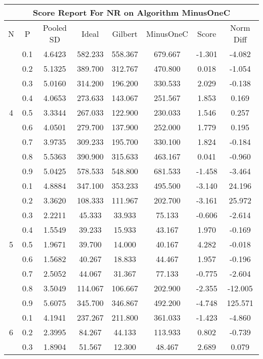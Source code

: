 \documentclass[11pt,a4paper]{report}
\begin{document}
\begin{longtable}{ | c | c || c | c | c | c | c | c | }
\hline
\multicolumn{8}{|c|}{ Score Report For NR on Algorithm MinusOneC} \\
\hline
N & P & Pooled SD &  Ideal &  Gilbert & MinusOneC  & Score & Norm Diff \\
 \hline
 \hline
 \endhead
\multirow{9}{*}{4} & 0.1 & 4.6423 & 582.233 & 558.367 & 679.667 & -1.301 & -4.082 \\
 & 0.2 & 5.1325 & 389.700 & 312.767 & 470.800 & 0.018 & -1.054 \\
 & 0.3 & 5.0160 & 314.200 & 196.200 & 330.533 & 2.029 & -0.138 \\
 & 0.4 & 4.0653 & 273.633 & 143.067 & 251.567 & 1.853 & 0.169 \\
 & 0.5 & 3.3344 & 267.033 & 122.900 & 230.033 & 1.546 & 0.257 \\
 & 0.6 & 4.0501 & 279.700 & 137.900 & 252.000 & 1.779 & 0.195 \\
 & 0.7 & 3.9735 & 309.233 & 195.700 & 330.100 & 1.824 & -0.184 \\
 & 0.8 & 5.5363 & 390.900 & 315.633 & 463.167 & 0.041 & -0.960 \\
 & 0.9 & 5.0425 & 578.533 & 548.800 & 681.533 & -1.458 & -3.464 \\
 \hline
\multirow{9}{*}{5} & 0.1 & 4.8884 & 347.100 & 353.233 & 495.500 & -3.140 & 24.196 \\
 & 0.2 & 3.3620 & 108.333 & 111.967 & 202.700 & -3.161 & 25.972 \\
 & 0.3 & 2.2211 & 45.333 & 33.933 & 75.133 & -0.606 & -2.614 \\
 & 0.4 & 1.5549 & 39.233 & 15.933 & 43.167 & 1.970 & -0.169 \\
 & 0.5 & 1.9671 & 39.700 & 14.000 & 40.167 & 4.282 & -0.018 \\
 & 0.6 & 1.5682 & 40.267 & 18.833 & 44.467 & 1.957 & -0.196 \\
 & 0.7 & 2.5052 & 44.067 & 31.367 & 77.133 & -0.775 & -2.604 \\
 & 0.8 & 3.5049 & 114.067 & 106.667 & 202.900 & -2.355 & -12.005 \\
 & 0.9 & 5.6075 & 345.700 & 346.867 & 492.200 & -4.748 & 125.571 \\
 \hline
\multirow{9}{*}{6} & 0.1 & 4.1941 & 237.267 & 211.800 & 361.033 & -1.423 & -4.860 \\
 & 0.2 & 2.3995 & 84.267 & 44.133 & 113.933 & 0.802 & -0.739 \\
 & 0.3 & 1.8904 & 51.567 & 12.300 & 48.467 & 2.689 & 0.079 \\

\end{longtable}
\end{document}
